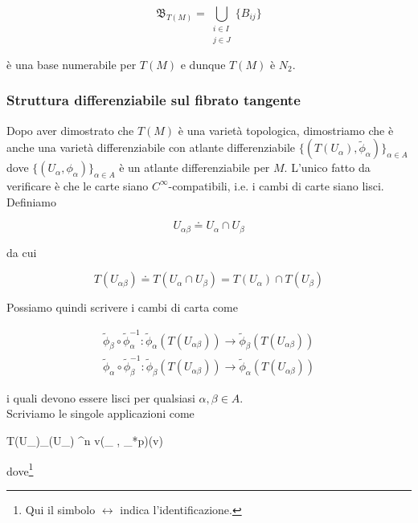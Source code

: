 \begin{equation}
	\mathfrak{B}_{T(M)} = \bigcup_{\substack{ i \in I \\ j \in J }} \{B_{ij}\}
\end{equation}

è una base numerabile per $ T(M) $ e dunque $ T(M) $ è $ N_{2} $.

\subsubsection{Struttura differenziabile sul fibrato tangente}

Dopo aver dimostrato che $ T(M) $ è una varietà topologica, dimostriamo che è anche una varietà differenziabile con atlante differenziabile $ \{(T(U_{\alpha}),\tilde{\phi}_{\alpha})\}_{\alpha \in A} $ dove $ \{(U_{\alpha},\phi_{\alpha})\}_{\alpha \in A} $ è un atlante differenziabile per $ M $. L'unico fatto da verificare è che le carte siano $ C^{\infty} $-compatibili, i.e. i cambi di carte siano lisci.\\
Definiamo

\begin{equation}
	U_{\alpha \beta} \doteq U_{\alpha} \cap U_{\beta}
\end{equation}

da cui

\begin{equation}
	T(U_{\alpha \beta}) \doteq T(U_{\alpha} \cap U_{\beta}) = T(U_{\alpha}) \cap T(U_{\beta})
\end{equation}

Possiamo quindi scrivere i cambi di carta come

\begin{gather}
	\tilde{\phi}_{\beta} \circ \tilde{\phi}_{\alpha}^{-1} : \tilde{\phi}_{\alpha}(T(U_{\alpha \beta})) \to \tilde{\phi}_{\beta}(T(U_{\alpha \beta})) \\
	\tilde{\phi}_{\alpha} \circ \tilde{\phi}_{\beta}^{-1} : \tilde{\phi}_{\beta}(T(U_{\alpha \beta})) \to \tilde{\phi}_{\alpha}(T(U_{\alpha \beta}))
\end{gather}

i quali devono essere lisci per qualsiasi $ \alpha,\beta \in A $.\\
Scriviamo le singole applicazioni come

\map{\tilde{\phi}_{\alpha}}
	{T(U_{\alpha})}{\phi_{\alpha}(U_{\alpha}) \times \R^{n}}
	{v}{(\phi_{\alpha} \circ \pi, \phi_{*p})(v)}

dove\footnote{%
	Qui il simbolo $ \longleftrightarrow $ indica l'identificazione.%
}

